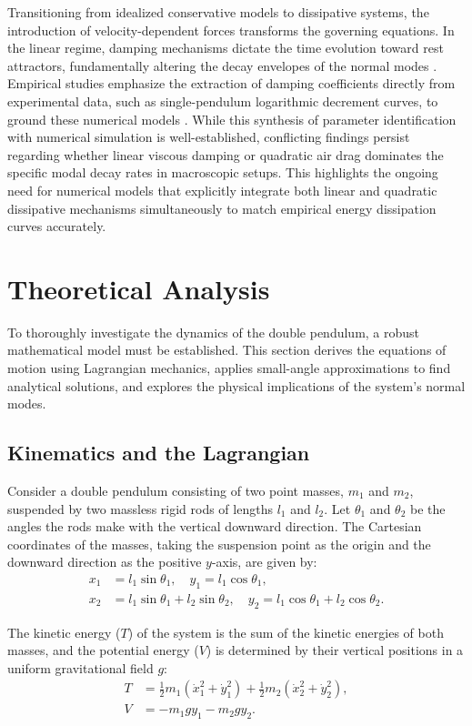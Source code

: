 \documentclass[12pt, a4paper, twoside]{article}
\begin{document}
Transitioning from idealized conservative models to dissipative systems, the introduction of velocity-dependent forces transforms the governing equations. In the linear regime, damping mechanisms dictate the time evolution toward rest attractors, fundamentally altering the decay envelopes of the normal modes \cite{baker1996pendulum}. Empirical studies emphasize the extraction of damping coefficients directly from experimental data, such as single-pendulum logarithmic decrement curves, to ground these numerical models \cite{peters1999resonance}. While this synthesis of parameter identification with numerical simulation is well-established, conflicting findings persist regarding whether linear viscous damping or quadratic air drag dominates the specific modal decay rates in macroscopic setups. This highlights the ongoing need for numerical models that explicitly integrate both linear and quadratic dissipative mechanisms simultaneously to match empirical energy dissipation curves accurately.

\section{Theoretical Analysis}
To thoroughly investigate the dynamics of the double pendulum, a robust mathematical model must be established. This section derives the equations of motion using Lagrangian mechanics, applies small-angle approximations to find analytical solutions, and explores the physical implications of the system's normal modes.

\subsection{Kinematics and the Lagrangian}
Consider a double pendulum consisting of two point masses, $m_1$ and $m_2$, suspended by two massless rigid rods of lengths $l_1$ and $l_2$. Let $\theta_1$ and $\theta_2$ be the angles the rods make with the vertical downward direction. The Cartesian coordinates of the masses, taking the suspension point as the origin and the downward direction as the positive $y$-axis, are given by:
\begin{align*}
x_1 &= l_1 \sin \theta_1, \quad y_1 = l_1 \cos \theta_1, \\
x_2 &= l_1 \sin \theta_1 + l_2 \sin \theta_2, \quad y_2 = l_1 \cos \theta_1 + l_2 \cos \theta_2.
\end{align*}

The kinetic energy ($T$) of the system is the sum of the kinetic energies of both masses, and the potential energy ($V$) is determined by their vertical positions in a uniform gravitational field $g$:
\begin{align*}
T &= \frac{1}{2}m_1(\dot{x}_1^2 + \dot{y}_1^2) + \frac{1}{2}m_2(\dot{x}_2^2 + \dot{y}_2^2), \\
V &= -m_1 g y_1 - m_2 g y_2.
\end{align*}
\end{document}
